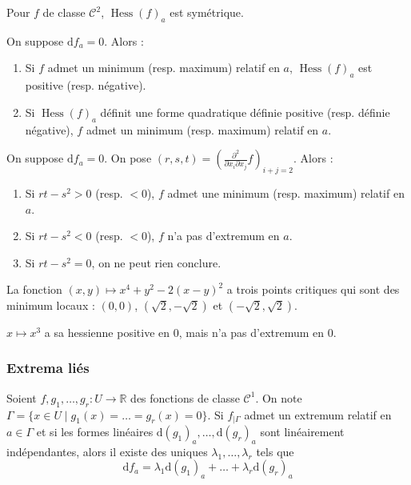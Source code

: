 	\begin{remark}
		Pour $f$ de classe $\mathcal{C}^2$, $\operatorname{Hess}(f)_a$ est symétrique.
	\end{remark}

	\begin{theorem}
		On suppose $\mathrm{d}f_a = 0$. Alors :
		\begin{enumerate}[label=(\roman*)]
			\item Si $f$ admet un minimum (resp. maximum) relatif en $a$, $\operatorname{Hess}(f)_a$ est positive (resp. négative).
			\item Si $\operatorname{Hess}(f)_a$ définit une forme quadratique définie positive (resp. définie négative), $f$ admet un minimum (resp. maximum) relatif en $a$.
		\end{enumerate}
	\end{theorem}

	\begin{example}
		On suppose $\mathrm{d}f_a = 0$. On pose $(r,s,t) = \left(  \frac{\partial^2}{\partial x_i \partial x_j} f \right)_{i+j=2}$. Alors :
		\begin{enumerate}[label=(\roman*)]
			\item Si $rt-s^2 > 0$ (resp. $< 0$), $f$ admet une minimum (resp. maximum) relatif en $a$.
			\item Si $rt-s^2 < 0$ (resp. $< 0$), $f$ n'a pas d'extremum en $a$.
			\item Si $rt-s^2 = 0$, on ne peut rien conclure.
		\end{enumerate}
	\end{example}

	\begin{example}
		La fonction $(x,y) \mapsto x^4 + y^2 - 2(x-y)^2$ a trois points critiques qui sont des minimum locaux : $(0,0)$, $(\sqrt{2},-\sqrt{2})$ et $(-\sqrt{2},\sqrt{2})$.
	\end{example}

	\begin{cexample}
		$x \mapsto x^3$ a sa hessienne positive en $0$, mais n'a pas d'extremum en $0$.
	\end{cexample}

	\subsubsection{Extrema liés}

	\reference{337}

	\begin{theorem}
		\label{219-1}
		Soient $f, g_1, \dots, g_r : U \rightarrow \mathbb{R}$ des fonctions de classe $\mathcal{C}^1$. On note $\Gamma = \{ x \in U \mid g_1(x) = \dots = g_r(x) = 0 \}$. Si $f_{|\Gamma}$ admet un extremum relatif en $a \in \Gamma$ et si les formes linéaires $\mathrm{d}(g_1)_a, \dots, \mathrm{d}(g_r)_a$ sont linéairement indépendantes, alors il existe des uniques $\lambda_1, \dots, \lambda_r$ tels que
		\[ \mathrm{d}f_a = \lambda_1 \mathrm{d}(g_1)_a + \dots + \lambda_r \mathrm{d}(g_r)_a \]
	\end{theorem}

